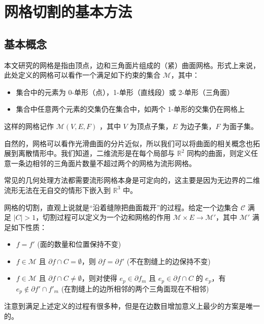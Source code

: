 
\chapter{网格切割的基本方法}

\section{基本概念}

本文研究的网格是指由顶点，边和三角面片组成的（紧）曲面网格。形式上来说，此处定义的网格可以看作一个满足如下约束的集合 $ \mathcal M $，其中：
\begin{itemize}
  \item 集合中的元素为 0-单形（点），1-单形（直线段）或 2-单形（三角面）
  \item 集合中任意两个元素的交集仍在集合中，如两个 1-单形的交集仍在网格上
\end{itemize}

这样的网格记作 $ \mathcal{M} (V, E, F) $ ，其中 $ V $ 为顶点子集，$ E $ 为边子集，$ F $ 为面子集。

自然的，网格可以看作光滑曲面的分片近似，所以我们可以将曲面的相关概念也拓展到离散情形中。我们知道，二维流形是在每个局部与 $ \mathbb{R}^2 $ 同构的曲面，则定义任意一条边相邻的三角面片数量不超过两个的网格为流形网格。

常见的几何处理方法都需要流形网格本身是可定向的，这主要是因为无边界的二维流形无法在无自交的情形下嵌入到 $ \mathbb{R}^3 $ 中。

网格的切割，直观上说就是“沿着缝隙把曲面裁开”的过程。给定一个边集合 $ \mathcal C $ 满足 $ |C| > 1 $，切割过程可以定义为一个边和网格的作用 $ \mathcal{M} \times E \to \mathcal{M'} $，其中 $ \mathcal{M'} $ 满足如下性质：
\begin{itemize}
  \item $ f = f' $ (面的数量和位置保持不变)
  \item $ f \in \mathcal{M} $ 且 $ \partial f \cap C = \emptyset $，则 $ \partial f = \partial f' $ (不在割缝上的边保持不变)
  \item $ f \in \mathcal{M} $ 且 $ \partial f \cap C \ne \emptyset$，则对使得 $ e_p \in \partial f_m $ 且 $ e_p \in \partial f \cap C $ 的 $ e_p $，有 $ e_p \notin \partial f' \cap f'_m $ (在割缝上的边所相邻的两个三角面现在不相邻)
\end{itemize}

注意到满足上述定义的过程有很多种，但是在边数目增加意义上最少的方案是唯一的。

